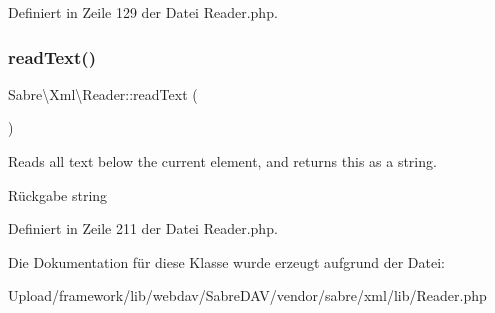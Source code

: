 Definiert in Zeile 129 der Datei Reader.\+php.

\mbox{\label{class_sabre_1_1_xml_1_1_reader_ae0c223537bae036b13bc4da2e2881179}} 
\subsubsection{\texorpdfstring{read\+Text()}{readText()}}
{\footnotesize\ttfamily Sabre\textbackslash{}\+Xml\textbackslash{}\+Reader\+::read\+Text (\begin{DoxyParamCaption}{ }\end{DoxyParamCaption})}

Reads all text below the current element, and returns this as a string.

\begin{DoxyReturn}{Rückgabe}
string 
\end{DoxyReturn}


Definiert in Zeile 211 der Datei Reader.\+php.



Die Dokumentation für diese Klasse wurde erzeugt aufgrund der Datei\+:\begin{DoxyCompactItemize}
\item 
Upload/framework/lib/webdav/\+Sabre\+D\+A\+V/vendor/sabre/xml/lib/Reader.\+php\end{DoxyCompactItemize}
